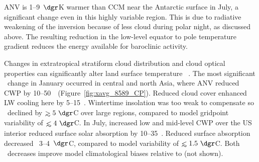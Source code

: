 \documentclass[agums]{aguplus}
\begin{document}
ANV is 1--9~$\dgr$K warmer than CCM near the Antarctic surface in
July, a significant change even in this highly variable region. 
This is due to radiative weakening of the inversion because of less
cloud during polar night, as discussed above.
The resulting reduction in the low-level equator to pole temperature
gradient reduces the energy available for baroclinic activity.

Changes in extratropical stratiform cloud distribution and cloud
optical properties can significantly alter land surface temperature
\Ts\ \cite[e.g.,][]{Kie942}.
The most significant \Ts\ change in January occurred in central and
north Asia, where ANV reduced CWP by 10--50~\gxmS\ 
(Figure~\ref{fig:xavg_8589_CP}).
Reduced cloud cover enhanced LW cooling here by 5--15~\wxmS.
Wintertime insolation was too weak to compensate so \Ts\ declined
by $\gtrsim 5\ \dgr$C over large regions, compared to model
gridpoint variability of $\lesssim 4\ \dgr$C.
In July, increased low and mid-level CWP over the US interior reduced
surface solar absorption by 10--35~\wxmS. 
Reduced surface absorption decreased \Ts\ 3--4~$\dgr$C, compared to
model variability of $\lesssim 1.5\ \dgr$C.  
Both \Ts\ decreases improve model climatological biases relative to
\cite{LeW90} (not shown).
\end{document}
